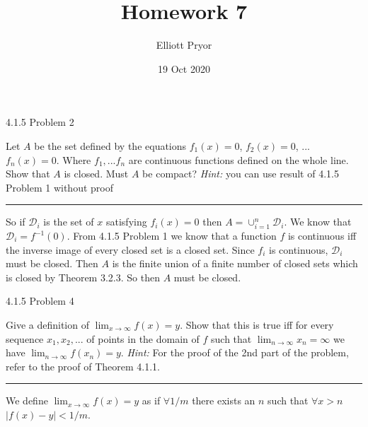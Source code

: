 \documentclass[11pt]{article}
\title{Homework 7}
\author{Elliott Pryor}
\date{19 Oct 2020}
\begin{document}
\maketitle

 4.1.5 Problem 2

Let $A$ be the set defined by the equations $f_1(x) = 0$, $f_2(x) = 0$, ... $f_n(x) = 0$. Where $f_1, ... f_n$ are continuous functions defined on the whole line. Show that $A$ is closed. Must $A$ be compact? \textit{Hint: } you can use result of 4.1.5 Problem 1 without proof
\hrule

So if $\mathcal{D}_i$ is the set of $x$ satisfying $f_i(x) = 0$ then $A = \cup_{i = 1}^n \mathcal{D}_i$. We know that $\mathcal{D}_i = f^{-1}(0)$. 
From 4.1.5 Problem 1 we know that a function $f$ is continuous iff the inverse image of every closed set is a closed set. Since $f_i$ is continuous, $\mathcal{D}_i$ must be closed. 
Then $A$ is the finite union of a finite number of closed sets which is closed by Theorem 3.2.3. So then $A$ must be closed.   



\newpage
{} 4.1.5 Problem 4

Give a definition of $\lim_{x \to \infty} f(x) = y$. Show that this is true iff for every sequence $x_1, x_2, ...$ of points in the domain of $f$ such that $\lim_{n \to \infty} x_n = \infty$ we have $\lim_{n\to \infty} f(x_n) = y$. \textit{Hint: } For the proof of the 2nd part of the problem, refer to the proof of Theorem 4.1.1.
\hrule

We define $\lim_{x \to \infty} f(x) = y$ as if $\forall 1/m$ there exists an $n$ such that $\forall x > n$ $|f(x) - y| < 1/m$. 
\end{document}
